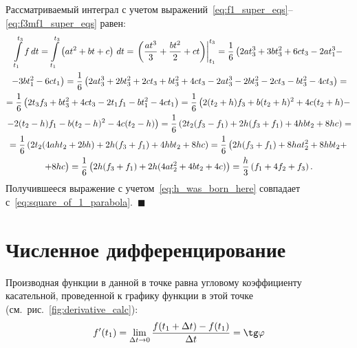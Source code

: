 \documentclass[12pt,a4paper,openany]{extarticle}
\begin{document}
Рассматриваемый интеграл с учетом выражений~\eqref{eq:f1_super_eqs}--\eqref{eq:f3mf1_super_eqs} равен:
\begin{multline}
\int\limits_{t_1}^{t_{3}} f\,dt = \int\limits_{t_1}^{t_{3}} \left(at^2+bt+c\right)\,dt = \left.\left(\dfrac{at^3}{3} + \dfrac{bt^2}{2}+ct\right)\right|^{t_3}_{t_1} = \frac{1}{6}\left(2at_3^3 + 3bt_3^2 + 6ct_3 - 2at_1^3 -\right.\\
%
\left.- 3bt_1^2 - 6ct_1\right) = \frac{1}{6}\left(2at_3^3 + 2bt_3^2 + 2ct_3 + bt_3^2 + 4ct_3 - 2at_3^3 - 2bt_3^2 - 2ct_3 - bt_3^2 - 4ct_3\right) =\\
%
= \frac{1}{6}\left(2t_3f_3 + bt_3^2 + 4ct_3 - 2t_1f_1 - bt_1^2 - 4ct_1\right) = \frac{1}{6}\left(2(t_2+h)f_3 + b(t_2+h)^2 + 4c(t_2+h) -\right.\\
%
\left.- 2(t_2-h)f_1 - b(t_2-h)^2 - 4c(t_2-h)\right) = \frac{1}{6}\left(2t_2(f_3-f_1) + 2h(f_3+f_1) + 4hbt_2 + 8hc\right) = \\
%
=\frac{1}{6}\left(2t_2(4aht_2 + 2bh) + 2h(f_3+f_1) + 4hbt_2 + 8hc\right) = \frac{1}{6}\left(2h(f_3+f_1)+8hat_2^2 + 8hbt_2+\right.\\
%
+ 8hc\bigr)=\frac{1}{6}\left(2h(f_3+f_1)+2h(4at_2^2 + 4bt_2 + 4c)\right) = \frac{h}{3}\left(f_1+4f_2+f_3\right)\ldotp
\end{multline}
Получившееся выражение с учетом~\eqref{eq:h_was_born_here} совпадает с~\eqref{eq:square_of_1_parabola}.~$\blacksquare$

\section{Численное дифференцирование}
\hspace*{\parindent}Производная функции в данной в точке равна угловому коэффициенту касательной, проведенной к графику функции в этой точке (см.~рис.~\ref{fig:derivative_calc}):
\begin{equation}
f'(t_1) = \lim_{\Delta t\rightarrow 0} \dfrac{f(t_1+\Delta t) - f(t_1)}{\Delta t} = \tg\varphi
\end{equation}
\end{document}
